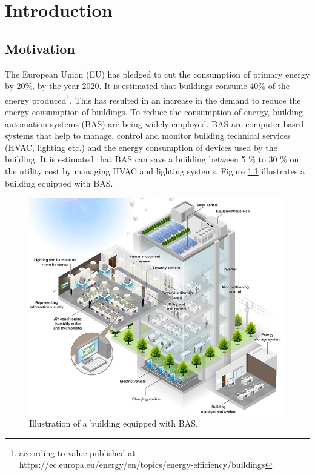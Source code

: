 \chapter{Introduction}
\label{chp:introduction}
\section{Motivation}
\label{sec:motivation}
The European Union (EU) has pledged to cut the consumption of primary energy by 20\%, by the year 2020.  It is estimated that buildings consume 40\% of the energy produced\footnote{according to value published at https://ec.europa.eu/energy/en/topics/energy-efficiency/buildings }.  This has resulted in an increase in the demand to reduce the energy consumption of buildings. To reduce the consumption of energy, building automation systems (BAS) are being widely employed. BAS are computer-based systems that help to manage, control and monitor building technical services (HVAC, lighting etc.) and the energy consumption of devices used by the building. It is estimated that BAS can save a building between 5 \% to 30 \% on the utility cost by managing HVAC and lighting systems\cite{bas}. Figure \ref{fig:BAS} illustrates a building equipped with BAS.

\begin{figure}[!ht]
\includegraphics[width=\textwidth]{./pics/bms.jpg}
\caption{Illustration of a building equipped with BAS.}
\label{fig:BAS}
\end{figure}

